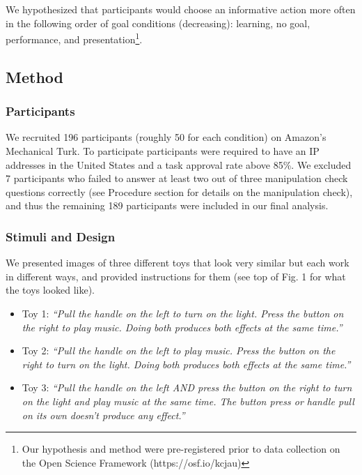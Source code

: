 \documentclass[10pt, letterpaper]{article}
\begin{document}
We hypothesized that participants would choose an informative action
more often in the following order of goal conditions (decreasing):
learning, no goal, performance, and
presentation\footnote{Our hypothesis and method were pre-registered prior to data collection on the Open Science Framework (https://osf.io/kcjau)}.

\subsection{Method}\label{method}

\subsubsection{Participants}\label{participants}

We recruited 196 participants (roughly 50 for each condition) on
Amazon's Mechanical Turk. To participate participants were required to
have an IP addresses in the United States and a task approval rate above
85\%. We excluded 7 participants who failed to answer at least two out
of three manipulation check questions correctly (see Procedure section
for details on the manipulation check), and thus the remaining 189
participants were included in our final analysis.

\subsubsection{Stimuli and Design}\label{stimuli-and-design}

We presented images of three different toys that look very similar but
each work in different ways, and provided instructions for them (see top
of Fig. 1 for what the toys looked like).

\begin{itemize}
\item
  Toy 1: \emph{``Pull the handle on the left to turn on the light. Press
  the button on the right to play music. Doing both produces both
  effects at the same time.''}
\item
  Toy 2: \emph{``Pull the handle on the left to play music. Press the
  button on the right to turn on the light. Doing both produces both
  effects at the same time.''}
\item
  Toy 3: \emph{``Pull the handle on the left AND press the button on the
  right to turn on the light and play music at the same time. The button
  press or handle pull on its own doesn't produce any effect.''}
\end{itemize}
\end{document}
